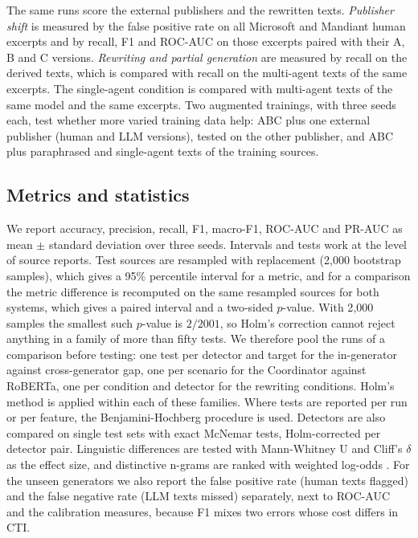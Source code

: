 \documentclass[journal]{IEEEtran}
\begin{document}
The same runs score the external publishers and the rewritten texts. \emph{Publisher shift} is measured by the
false positive rate on all Microsoft and Mandiant human excerpts and by recall, F1 and ROC-AUC on those excerpts
paired with their A, B and C versions. \emph{Rewriting and partial generation} are measured by recall on the
derived texts, which is compared with recall on the multi-agent texts of the same excerpts. The single-agent
condition is compared with multi-agent texts of the same model and the same excerpts. Two augmented trainings, with
three seeds each, test whether more varied training data help: ABC plus one external publisher (human and LLM
versions), tested on the other publisher, and ABC plus paraphrased and single-agent texts of the training sources.

\subsection{Metrics and statistics}
We report accuracy, precision, recall, F1, macro-F1, ROC-AUC and PR-AUC as mean $\pm$ standard deviation over three
seeds. Intervals and tests work at the level of source reports. Test sources are resampled with replacement
(2{,}000 bootstrap samples), which gives a 95\% percentile interval for a metric, and for a comparison the metric
difference is recomputed on the same resampled sources for both systems, which gives a paired interval and a
two-sided $p$-value. With 2{,}000 samples the smallest such $p$-value is $2/2001$, so Holm's correction
\cite{Holm_1979} cannot reject anything in a family of more than fifty tests. We therefore pool the runs of a
comparison before testing: one test per detector and target for the in-generator against cross-generator gap, one
per scenario for the Coordinator against RoBERTa, one per condition and detector for the rewriting conditions.
Holm's method is applied within each of these families. Where tests are reported per run or per feature, the
Benjamini-Hochberg procedure \cite{Benjamini_1995} is used. Detectors are also compared on single test sets with
exact McNemar tests, Holm-corrected per detector pair. Linguistic differences are tested with Mann-Whitney U and
Cliff's $\delta$ as the effect size, and distinctive n-grams are ranked with weighted log-odds \cite{Monroe_2008}.
For the unseen generators we also report the false positive rate (human texts flagged) and the false negative rate
(LLM texts missed) separately, next to ROC-AUC and the calibration measures, because F1 mixes two errors whose cost
differs in CTI.
\end{document}
